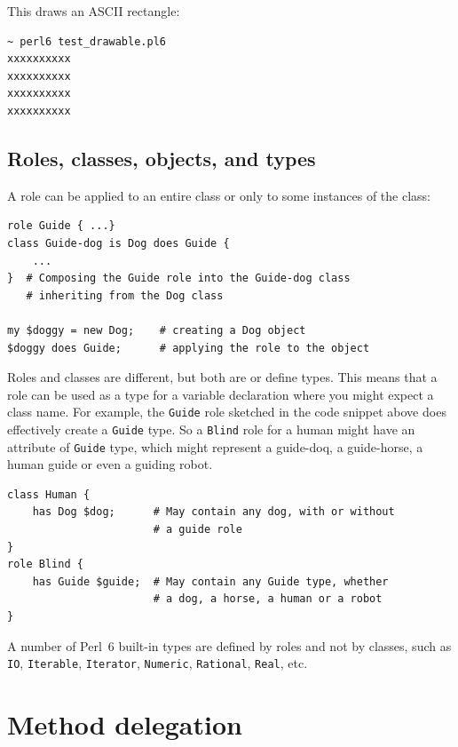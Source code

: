 This draws an ASCII rectangle:
\begin{verbatim}
~ perl6 test_drawable.pl6
xxxxxxxxxx
xxxxxxxxxx
xxxxxxxxxx
xxxxxxxxxx
\end{verbatim}

\subsection{Roles, classes, objects, and types}

A role can be applied to an entire class or only to some 
instances of the class:

\begin{verbatim}
role Guide { ...}
class Guide-dog is Dog does Guide { 
    ... 
}  # Composing the Guide role into the Guide-dog class
   # inheriting from the Dog class

my $doggy = new Dog;    # creating a Dog object
$doggy does Guide;      # applying the role to the object
\end{verbatim}

Roles and classes are different, but both are or define types.
This means that a role can be used as a type for a variable 
declaration where you might expect a class name. For example, 
the {\tt Guide} role sketched in the code snippet above does 
effectively create a {\tt Guide} type. So a {\tt Blind} role for 
a human might have an attribute of {\tt Guide} type, which 
might represent a guide-doq, a guide-horse, a human guide or 
even a guiding robot.

\begin{verbatim}
class Human {
    has Dog $dog;      # May contain any dog, with or without
                       # a guide role
}
role Blind {
    has Guide $guide;  # May contain any Guide type, whether 
                       # a dog, a horse, a human or a robot
}
\end{verbatim}

A number of Perl~6 built-in types are defined by roles and 
not by classes, such as {\tt IO}, {\tt Iterable}, 
{\tt Iterator}, {\tt Numeric}, {\tt Rational}, {\tt Real},
etc.

\section{Method delegation}

